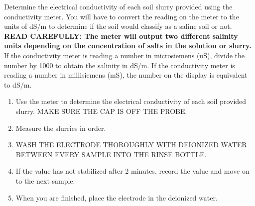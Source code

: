 \documentclass[
  letterpaper,
  twocolumn,
  portrait]{scrbook}
\providecommand{\tightlist}{%
  \setlength{\itemsep}{0pt}\setlength{\parskip}{0pt}}\usepackage{longtable,booktabs,array}
\begin{document}
Determine the electrical conductivity of each soil slurry provided using
the conductivity meter. You will have to convert the reading on the
meter to the units of dS/m to determine if the soil would classify as a
saline soil or not. \textbf{READ CAREFULLY: The meter will output two
different salinity units depending on the concentration of salts in the
solution or slurry.} If the conductivity meter is reading a number in
microsiemens (uS), divide the number by 1000 to obtain the salinity in
dS/m. If the conductivity meter is reading a number in millisiemens
(mS), the number on the display is equivalent to dS/m.

\begin{enumerate}
\def\labelenumi{\arabic{enumi}.}
\tightlist
\item
  Use the meter to determine the electrical conductivity of each soil
  provided slurry. MAKE SURE THE CAP IS OFF THE PROBE.
\item
  Measure the slurries in order.
\item
  WASH THE ELECTRODE THOROUGHLY WITH DEIONIZED WATER BETWEEN EVERY
  SAMPLE INTO THE RINSE BOTTLE.
\item
  If the value has not stabilized after 2 minutes, record the value and
  move on to the next sample.
\item
  When you are finished, place the electrode in the deionized water.
\end{enumerate}

 
  \providecommand{\huxb}[2]{\arrayrulecolor[RGB]{#1}\global\arrayrulewidth=#2pt}
  \providecommand{\huxvb}[2]{\color[RGB]{#1}\vrule width #2pt}
  \providecommand{\huxtpad}[1]{\rule{0pt}{#1}}
  \providecommand{\huxbpad}[1]{\rule[-#1]{0pt}{#1}}
\end{document}
